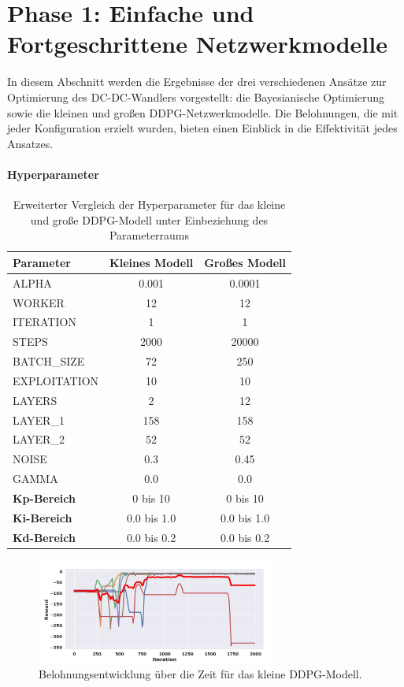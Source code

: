 \section{Phase 1: Einfache und Fortgeschrittene Netzwerkmodelle}
\label{subsec:Basic_Advanced_Models}

In diesem Abschnitt werden die Ergebnisse der drei verschiedenen Ansätze zur Optimierung des DC-DC-Wandlers vorgestellt: die Bayesianische Optimierung sowie die kleinen und großen DDPG-Netzwerkmodelle. Die Belohnungen, die mit jeder Konfiguration erzielt wurden, bieten einen Einblick in die Effektivität jedes Ansatzes.

\paragraph{Hyperparameter}

\begin{table}[htbp]
\centering
\caption{Erweiterter Vergleich der Hyperparameter für das kleine und große DDPG-Modell unter Einbeziehung des Parameterraums}
\label{tab:extended_hyperparameters}
\begin{tabular}{lcc}
\hline
\textbf{Parameter} & \textbf{Kleines Modell} & \textbf{Großes Modell} \\
\hline
ALPHA & 0.001 & 0.0001 \\
WORKER & 12 & 12 \\
ITERATION & 1 & 1 \\
STEPS & 2000 & 20000 \\
BATCH\_SIZE & 72 & 250 \\
EXPLOITATION & 10 & 10 \\
LAYERS & 2 & 12 \\
LAYER\_1 & 158 & 158 \\
LAYER\_2 & 52 & 52 \\
NOISE & 0.3 & 0.45 \\
GAMMA & 0.0 & 0.0 \\
\textbf{Kp-Bereich} & 0 bis 10 & 0 bis 10 \\
\textbf{Ki-Bereich} & 0.0 bis 1.0 & 0.0 bis 1.0 \\
\textbf{Kd-Bereich} & 0.0 bis 0.2 & 0.0 bis 0.2 \\
\hline
\end{tabular}
\end{table}

\begin{figure}[htbp]
\centering
\includegraphics[width=0.7\textwidth]{4Ergebnisse/Phasen/1Phase/1Q_klein_epoch.png}
\caption{Belohnungsentwicklung über die Zeit für das kleine DDPG-Modell.}
\end{figure}

